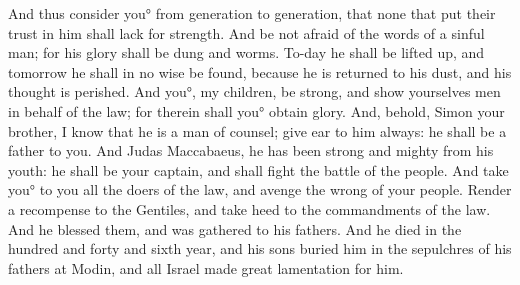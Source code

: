 {And thus consider you° from generation to generation, that none that put their trust in him shall lack for strength.
And be not afraid of the words of a sinful man; for his glory shall be dung and worms.
To-day he shall be lifted up, and tomorrow he shall in no wise be found, because he is returned to his dust, and his thought is perished.
And you°, my children, be strong, and show yourselves men in behalf of the law; for therein shall you° obtain glory.
And, behold, Simon your brother, I know that he is a man of counsel; give ear to him always: he shall be a father to you.
And Judas Maccabaeus, he has been strong and mighty from his youth: he shall be your captain, and
 shall fight the battle of the people.
And take you° to you all the doers of the law, and avenge the wrong of your people.
Render a recompense to the Gentiles, and take heed to the commandments of the law.
And he blessed them, and was gathered to his fathers.
And he died in
 the hundred and forty and sixth year, and his sons buried him in the sepulchres of his fathers at Modin, and all Israel made great lamentation for him.

}

